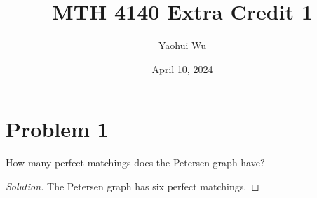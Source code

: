 \documentclass[12pt]{article}
\title{MTH 4140 Extra Credit 1}
\author{Yaohui Wu}
\date{April 10, 2024}
\newenvironment*{solution}{\begin{proof}[Solution]}{\end{proof}}
\begin{document}
\maketitle
\section*{Problem 1}
How many perfect matchings does the Petersen graph have?
\begin{solution}
    The Petersen graph has six perfect matchings.
\end{solution}
\end{document}
